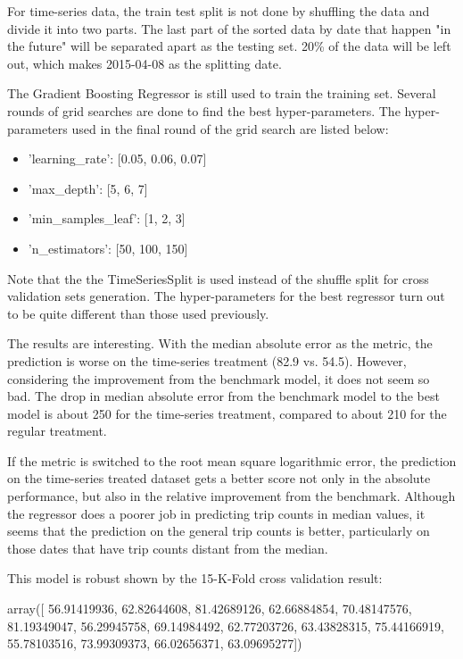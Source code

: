 \documentclass[a4paper]{article}
\begin{document}
			For time-series data, the train test split is not done by shuffling the data and divide it into two parts. The last part of the sorted data by date that happen "in the future" will be separated apart as the testing set. 20\% of the data will be left out, which makes 2015-04-08 as the splitting date. 
			
			The Gradient Boosting Regressor is still used to train the training set. Several rounds of grid searches are done to find the best hyper-parameters. The hyper-parameters used in the final round of the grid search are listed below:
			
			\begin{itemize}
				\item 'learning\_rate': [0.05, 0.06, 0.07]
				\item 'max\_depth': [5, 6, 7]
				\item 'min\_samples\_leaf': [1, 2, 3]
				\item 'n\_estimators': [50, 100, 150]
			\end{itemize}			
			
			Note that the the TimeSeriesSplit is used instead of the shuffle split for cross validation sets generation. The hyper-parameters for the best regressor turn out to be quite different than those used previously. 
			
			The results are interesting. With the median absolute error as the metric, the prediction is worse on the time-series treatment (82.9 vs. 54.5). However, considering the improvement from the benchmark model, it does not seem so bad. The drop in median absolute error from the benchmark model to the best model is about 250 for the time-series treatment, compared to about 210 for the regular treatment. 
			
			If the metric is switched to the root mean square logarithmic error, the prediction on the time-series treated dataset gets a better score not only in the absolute performance, but also in the relative improvement from the benchmark. Although the regressor does a poorer job in predicting trip counts in median values, it seems that the prediction on the general trip counts is better, particularly on those dates that have trip counts distant from the median.
			
			This model is robust shown by the 15-K-Fold cross validation result:
						
			array([ 56.91419936,  62.82644608,  81.42689126,  62.66884854,
					70.48147576,  81.19349047,  56.29945758,  69.14984492,
					62.77203726,  63.43828315,  75.44166919,  55.78103516,
					73.99309373,  66.02656371,  63.09695277])		
			
\end{document}
